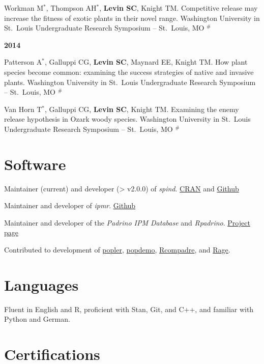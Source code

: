 \documentclass[11pt,]{article}
\begin{document}
Workman M\(^\ast\), Thompson AH\(^\ast\), \textbf{Levin SC}, Knight TM.
Competitive release may increase the fitness of exotic plants in their
novel range. Washington University in St.~Louis Undergraduate Research
Symposium -- St.~Louis, MO \(^\#\)

\textbf{2014}

Patterson A\(^\ast\), Galluppi CG, \textbf{Levin SC}, Maynard EE, Knight
TM. How plant species become common: examining the success strategies of
native and invasive plants. Washington University in St.~Louis
Undergraduate Research Symposium -- St.~Louis, MO \(^\#\)

Van Horn T\(^\ast\), Galluppi CG, \textbf{Levin SC}, Knight TM.
Examining the enemy release hypothesis in Ozark woody species.
Washington University in St.~Louis Undergraduate Research Symposium --
St.~Louis, MO \(^\#\)

\hypertarget{software}{%
\section{Software}\label{software}}

Maintainer (current) and developer (\textgreater{} v2.0.0) of
\emph{spind}.
\href{https://cran.r-project.org/web/checks/check_results_spind.html}{CRAN}
and \href{https://github.com/levisc8/spind}{Github}

Maintainer and developer of \emph{ipmr}.
\href{https://github.com/levisc8/ipmr}{Github}

Maintainer and developer of the \emph{Padrino IPM Database} and
\emph{Rpadrino}.
\href{https://levisc8.github.io/Padrino.github.io/}{Project page}

Contributed to development of
\href{https://github.com/AldoCompagnoni/popler}{popler},
\href{https://github.com/iainmstott/popdemo}{popdemo},
\href{https://github.com/jonesor/Rcompadre}{Rcompadre}, and
\href{https://github.com/jonesor/Rage}{Rage}.

\hypertarget{languages}{%
\section{Languages}\label{languages}}

Fluent in English and R, proficient with Stan, Git, and C++, and
familiar with Python and German.

\hypertarget{certifications}{%
\section{Certifications}\label{certifications}}
\end{document}
